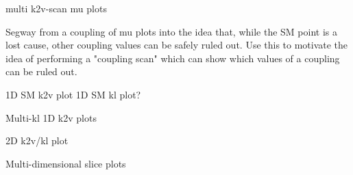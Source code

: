 multi k2v-scan mu plots

Segway from a coupling of mu plots into the idea that, while the SM point is a lost cause,
    other coupling values can be safely ruled out.
Use this to motivate the idea of performing a "coupling scan"
    which can show which values of a coupling can be ruled out.

1D SM k2v plot
1D SM kl plot?

Multi-kl 1D k2v plots

2D k2v/kl plot

Multi-dimensional slice plots
